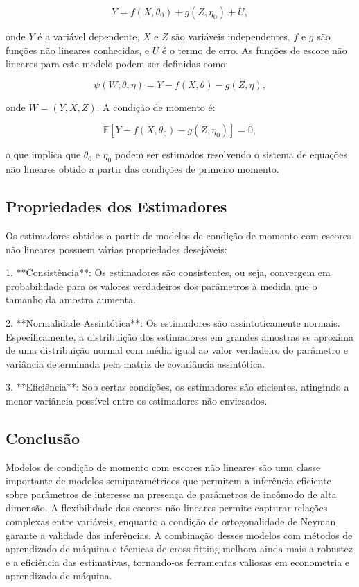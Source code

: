 \documentclass[a4paper,12pt]{article}[abntex2]
\begin{document}
\[
Y = f(X, \theta_0) + g(Z, \eta_0) + U,
\]

onde $Y$ é a variável dependente, $X$ e $Z$ são variáveis independentes, $f$ e $g$ são funções não lineares conhecidas, e $U$ é o termo de erro. As funções de escore não lineares para este modelo podem ser definidas como:

\[
\psi(W; \theta, \eta) = Y - f(X, \theta) - g(Z, \eta),
\]

onde $W = (Y, X, Z)$. A condição de momento é:

\[
\mathbb{E}[Y - f(X, \theta_0) - g(Z, \eta_0)] = 0,
\]

o que implica que $\theta_0$ e $\eta_0$ podem ser estimados resolvendo o sistema de equações não lineares obtido a partir das condições de primeiro momento.

\subsection*{Propriedades dos Estimadores}

Os estimadores obtidos a partir de modelos de condição de momento com escores não lineares possuem várias propriedades desejáveis:

1. **Consistência**: Os estimadores são consistentes, ou seja, convergem em probabilidade para os valores verdadeiros dos parâmetros à medida que o tamanho da amostra aumenta.

2. **Normalidade Assintótica**: Os estimadores são assintoticamente normais. Especificamente, a distribuição dos estimadores em grandes amostras se aproxima de uma distribuição normal com média igual ao valor verdadeiro do parâmetro e variância determinada pela matriz de covariância assintótica.

3. **Eficiência**: Sob certas condições, os estimadores são eficientes, atingindo a menor variância possível entre os estimadores não enviesados.

\subsection*{Conclusão}

Modelos de condição de momento com escores não lineares são uma classe importante de modelos semiparamétricos que permitem a inferência eficiente sobre parâmetros de interesse na presença de parâmetros de incômodo de alta dimensão. A flexibilidade dos escores não lineares permite capturar relações complexas entre variáveis, enquanto a condição de ortogonalidade de Neyman garante a validade das inferências. A combinação desses modelos com métodos de aprendizado de máquina e técnicas de cross-fitting melhora ainda mais a robustez e a eficiência das estimativas, tornando-os ferramentas valiosas em econometria e aprendizado de máquina.
\end{document}
